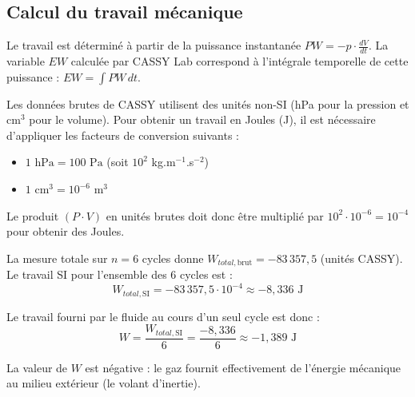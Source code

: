 \documentclass[a4paper,9pt,french]{scrartcl}
\begin{document}
\subsection{Calcul du travail mécanique}

Le travail est déterminé à partir de la puissance instantanée $PW = -p \cdot \frac{dV}{dt}$. La variable $EW$ calculée par CASSY Lab correspond à l'intégrale temporelle de cette puissance : $EW = \int PW \, dt$.

Les données brutes de CASSY utilisent des unités non-SI (hPa pour la pression et cm$^3$ pour le volume). Pour obtenir un travail en Joules (J), il est nécessaire d'appliquer les facteurs de conversion suivants :
\begin{itemize}
    \item $1 \text{ hPa} = 100 \text{ Pa}$ (soit $10^2$ kg.m$^{-1}$.s$^{-2}$)
    \item $1 \text{ cm}^3 = 10^{-6} \text{ m}^3$
\end{itemize}
Le produit $(P \cdot V)$ en unités brutes doit donc être multiplié par $10^2 \cdot 10^{-6} = {10^{-4}}$ pour obtenir des Joules.


La mesure totale sur $n = 6$ cycles donne $W_{total, \text{brut}} = -83\,357,5$ (unités CASSY).
Le travail SI pour l'ensemble des 6 cycles est :
$$W_{total, \text{SI}} = -83\,357,5 \cdot 10^{-4} \approx -8,336 \text{ J}$$

Le travail fourni par le fluide au cours d'un seul cycle est donc :
$$W = \frac{W_{total, \text{SI}}}{6} = \frac{-8,336}{6} \approx -1,389 \text{ J}$$


La valeur de $W$ est négative : le gaz fournit effectivement de l'énergie mécanique au milieu extérieur (le volant d'inertie).
\end{document}
